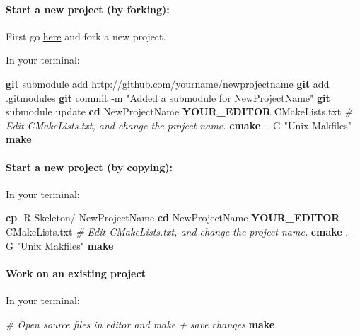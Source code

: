 \documentclass[]{article}
\newenvironment{Shaded}{\begin{snugshade}}{\end{snugshade}}
\newcommand{\KeywordTok}[1]{\textcolor[rgb]{0.13,0.29,0.53}{\textbf{{#1}}}}
\newcommand{\StringTok}[1]{\textcolor[rgb]{0.31,0.60,0.02}{{#1}}}
\newcommand{\CommentTok}[1]{\textcolor[rgb]{0.56,0.35,0.01}{\textit{{#1}}}}
\newcommand{\NormalTok}[1]{{#1}}
\begin{document}
\paragraph{Start a new project (by forking):}

First go \href{https://github.com/rohit507/GNU-LPC-Skeleton}{here} and
fork a new project.

In your terminal:

\begin{Shaded}
\begin{Highlighting}[]
    \KeywordTok{git} \NormalTok{submodule add http://github.com/yourname/newprojectname}
    \KeywordTok{git} \NormalTok{add .gitmodules}
    \KeywordTok{git} \NormalTok{commit -m }\StringTok{"Added a submodule for NewProjectName"}
    \KeywordTok{git} \NormalTok{submodule update}
    \KeywordTok{cd} \NormalTok{NewProjectName}
    \KeywordTok{YOUR_EDITOR} \NormalTok{CMakeLists.txt}
    \CommentTok{# Edit CMakeLists.txt, and change the project name.}
    \KeywordTok{cmake} \NormalTok{. -G }\StringTok{"Unix Makfiles"}
    \KeywordTok{make}
\end{Highlighting}
\end{Shaded}

\paragraph{Start a new project (by copying):}

In your terminal:

\begin{Shaded}
\begin{Highlighting}[]
    \KeywordTok{cp} \NormalTok{-R Skeleton/ NewProjectName}
    \KeywordTok{cd} \NormalTok{NewProjectName}
    \KeywordTok{YOUR_EDITOR} \NormalTok{CMakeLists.txt}
    \CommentTok{# Edit CMakeLists.txt, and change the project name.}
    \KeywordTok{cmake} \NormalTok{. -G }\StringTok{"Unix Makfiles"}
    \KeywordTok{make}
\end{Highlighting}
\end{Shaded}

\paragraph{Work on an existing project}

In your terminal:

\begin{Shaded}
\begin{Highlighting}[]
    \CommentTok{# Open source files in editor and make + save changes}
    \KeywordTok{make}
\end{Highlighting}
\end{Shaded}
\end{document}
